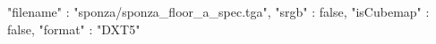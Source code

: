 { 
	"filename" : "sponza/sponza_floor_a_spec.tga", 
	"srgb" : false,
	"isCubemap" : false,
	"format" : "DXT5"
}